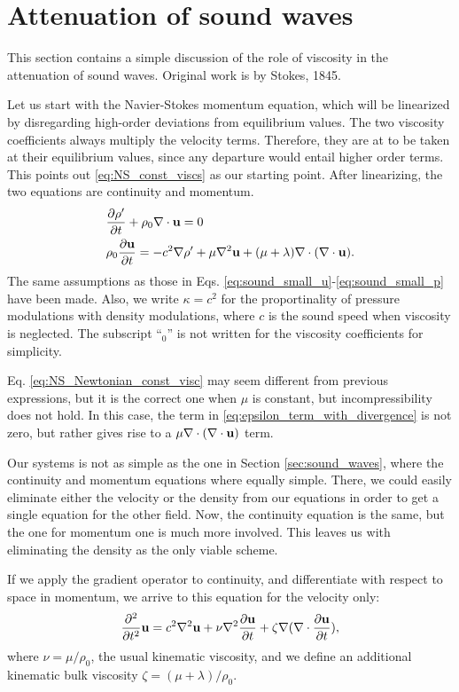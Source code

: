 
\section{Attenuation of sound waves}
\label{sec:sound_waves_att}

This section contains a simple discussion of the role of viscosity in
the attenuation of sound waves. Original work is by Stokes, 1845.

Let us start with the Navier-Stokes momentum equation, which will be
linearized by disregarding high-order deviations from equilibrium
values. The two viscosity coefficients always multiply the velocity
terms. Therefore, they are at to be taken at their equilibrium values,
since any departure would entail higher order terms. This points out
\ref{eq:NS_const_viscs} as our starting point. After linearizing, the
two equations are continuity and momentum.
\begin{align}
  & \frac{\partial\rho' }{\partial t}  + \rho_0 \nabla\cdot\mathbf{u} =0 \\
  & \label{eq:NS_Newtonian_const_visc}
    \rho_0 \frac{\partial \mathbf{u} }{\partial t} =
    - c^2 \nabla \rho' + \mu \nabla^2 \mathbf{u}
    + ( \mu + \lambda ) \nabla\cdot ( \nabla\cdot\mathbf{u} ) .
\end{align}
The same assumptions as those in
Eqs. \ref{eq:sound_small_u}-\ref{eq:sound_small_p} have been made.
Also, we write $\kappa = c^2$ for the proportinality of pressure
modulations with density modulations, where $c$ is the sound speed
when viscosity is neglected. The subscript ``$_0$'' is not written for
the viscosity coefficients for simplicity.

Eq. \ref{eq:NS_Newtonian_const_visc} may seem different from previous
expressions, but it is the correct one when $\mu$ is constant, but
incompressibility does not hold. In this case, the term in
\ref{eq:epsilon_term_with_divergence} is not zero, but rather gives
rise to a $\mu \nabla\cdot ( \nabla\cdot\mathbf{u} )$ term.

Our systems is not as simple as the one in Section
\ref{sec:sound_waves}, where the continuity and momentum equations
where equally simple. There, we could easily eliminate either the
velocity or the density from our equations in order to get a single
equation for the other field. Now, the continuity equation is the
same, but the one for momentum one is much more involved. This leaves
us with eliminating the density as the only viable scheme.

If we apply the gradient operator to continuity, and differentiate
with respect to space in momentum, we arrive to this equation for
the velocity only:
\begin{equation}
  \label{eq:sound_att_Fourier}
  \frac{\partial^2 }{\partial t^2 } \mathbf{u} =
  c^2\nabla^2 \mathbf{u} + \nu \nabla^2\frac{\partial\mathbf{u}}{\partial t} +
  \zeta \nabla (\nabla\cdot \frac{\partial\mathbf{u}}{\partial t} ) ,
\end{equation}
where $\nu=\mu/\rho_0$, the usual kinematic viscosity, and we define
an additional kinematic bulk viscosity $\zeta=(\mu+\lambda)/\rho_0$.


